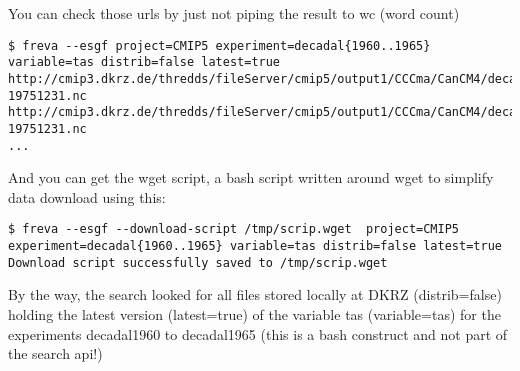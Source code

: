 \documentclass[a4paper,11pt]{ltxdoc}
\begin{document}
You can check those urls by just not piping the result to wc (word count)
\begin{lstlisting}
$ freva --esgf project=CMIP5 experiment=decadal{1960..1965} variable=tas distrib=false latest=true
http://cmip3.dkrz.de/thredds/fileServer/cmip5/output1/CCCma/CanCM4/decadal1965/day/atmos/day/r10i1p1/v20120531/tas/tas_day_CanCM4_decadal1965_r10i1p1_19660101-19751231.nc
http://cmip3.dkrz.de/thredds/fileServer/cmip5/output1/CCCma/CanCM4/decadal1965/day/atmos/day/r10i2p1/v20120531/tas/tas_day_CanCM4_decadal1965_r10i2p1_19660101-19751231.nc
...
\end{lstlisting}
And you can get the wget script, a bash script written around wget to simplify data download using this:
\begin{lstlisting}
$ freva --esgf --download-script /tmp/scrip.wget  project=CMIP5 experiment=decadal{1960..1965} variable=tas distrib=false latest=true 
Download script successfully saved to /tmp/scrip.wget
\end{lstlisting}
By the way, the search looked for all files stored locally at DKRZ (distrib=false) holding the latest version (latest=true) of the variable tas (variable=tas) for the experiments decadal1960 to decadal1965 (this is a bash construct and not part of the search api!)
\end{document}

